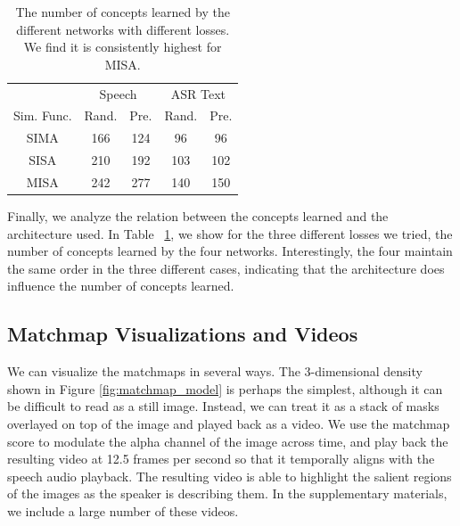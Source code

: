 \begin{table}
\centering
  \setlength\tabcolsep{3pt}
  \caption[Number of concepts learned]{The number of concepts learned by the different networks with different losses. We find it is consistently highest for MISA.}
    \label{tab:concept_loss}
  \begin{tabular}{ccccc}
    \toprule
    \multicolumn{1}{c}{} & \multicolumn{2}{c}{Speech} & \multicolumn{2}{c}{ASR Text} \\
	Sim. Func. & Rand. & Pre. & Rand. & Pre. \\
    \cmidrule(lr){2-3}\cmidrule(lr){4-5}
    \midrule
    SIMA & 166 & 124 & 96 & 96  \\
    SISA & 210 & 192 & 103 & 102 \\
    MISA & 242 & 277 & 140 & 150 \\
    \bottomrule
  \end{tabular}
\end{table}

Finally, we analyze the relation between the concepts learned and the architecture used. In Table ~\ref{tab:concept_loss}, we show for the three different losses we tried, the number of concepts learned by the four networks. Interestingly, the four maintain the same order in the three different cases, indicating that the architecture does influence the number of concepts learned.


\subsection{Matchmap Visualizations and Videos}
We can visualize the matchmaps in several ways. The 3-dimensional density shown in Figure \ref{fig:matchmap_model} is perhaps the simplest, although it can be difficult to read as a still image. Instead, we can treat it as a stack of masks overlayed on top of the image and played back as a video. We use the matchmap score to modulate the alpha channel of the image across time, and play back the resulting video at 12.5 frames per second so that it temporally aligns with the speech audio playback. The resulting video is able to highlight the salient regions of the images as the speaker is describing them. In the supplementary materials, we include a large number of these videos. 

